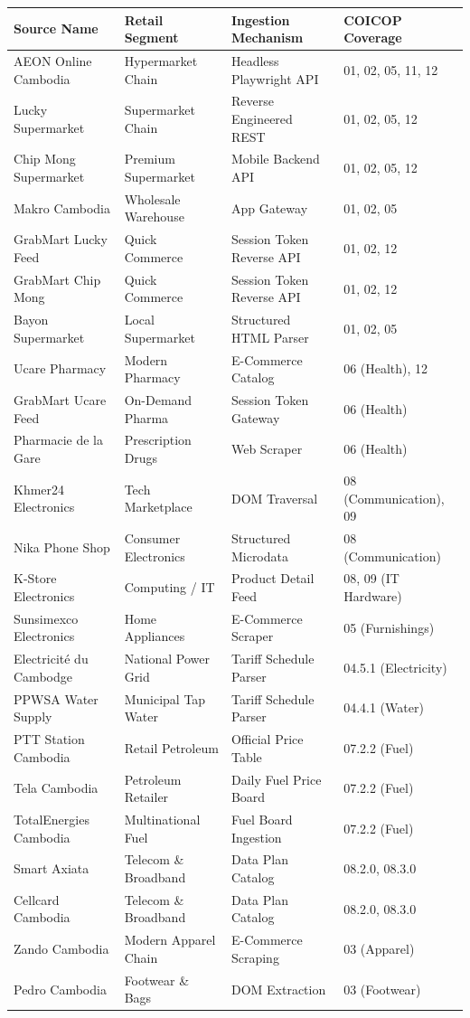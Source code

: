 \documentclass[11pt,a4paper]{article}
\begin{document}
\begin{longtable}{p{4.0cm}p{3.2cm}p{3.2cm}p{3.4cm}}
\toprule
\textbf{Source Name} & \textbf{Retail Segment} & \textbf{Ingestion Mechanism} & \textbf{COICOP Coverage} \\
\midrule
\endhead
AEON Online Cambodia & Hypermarket Chain & Headless Playwright API & 01, 02, 05, 11, 12 \\
Lucky Supermarket & Supermarket Chain & Reverse Engineered REST & 01, 02, 05, 12 \\
Chip Mong Supermarket & Premium Supermarket & Mobile Backend API & 01, 02, 05, 12 \\
Makro Cambodia & Wholesale Warehouse & App Gateway & 01, 02, 05 \\
GrabMart Lucky Feed & Quick Commerce & Session Token Reverse API & 01, 02, 12 \\
GrabMart Chip Mong & Quick Commerce & Session Token Reverse API & 01, 02, 12 \\
Bayon Supermarket & Local Supermarket & Structured HTML Parser & 01, 02, 05 \\
Ucare Pharmacy & Modern Pharmacy & E-Commerce Catalog & 06 (Health), 12 \\
GrabMart Ucare Feed & On-Demand Pharma & Session Token Gateway & 06 (Health) \\
Pharmacie de la Gare & Prescription Drugs & Web Scraper & 06 (Health) \\
Khmer24 Electronics & Tech Marketplace & DOM Traversal & 08 (Communication), 09 \\
Nika Phone Shop & Consumer Electronics & Structured Microdata & 08 (Communication) \\
K-Store Electronics & Computing / IT & Product Detail Feed & 08, 09 (IT Hardware) \\
Sunsimexco Electronics & Home Appliances & E-Commerce Scraper & 05 (Furnishings) \\
Electricité du Cambodge & National Power Grid & Tariff Schedule Parser & 04.5.1 (Electricity) \\
PPWSA Water Supply & Municipal Tap Water & Tariff Schedule Parser & 04.4.1 (Water) \\
PTT Station Cambodia & Retail Petroleum & Official Price Table & 07.2.2 (Fuel) \\
Tela Cambodia & Petroleum Retailer & Daily Fuel Price Board & 07.2.2 (Fuel) \\
TotalEnergies Cambodia & Multinational Fuel & Fuel Board Ingestion & 07.2.2 (Fuel) \\
Smart Axiata & Telecom \& Broadband & Data Plan Catalog & 08.2.0, 08.3.0 \\
Cellcard Cambodia & Telecom \& Broadband & Data Plan Catalog & 08.2.0, 08.3.0 \\
Zando Cambodia & Modern Apparel Chain & E-Commerce Scraping & 03 (Apparel) \\
Pedro Cambodia & Footwear \& Bags & DOM Extraction & 03 (Footwear) \\
\bottomrule
\end{longtable}
\end{document}
